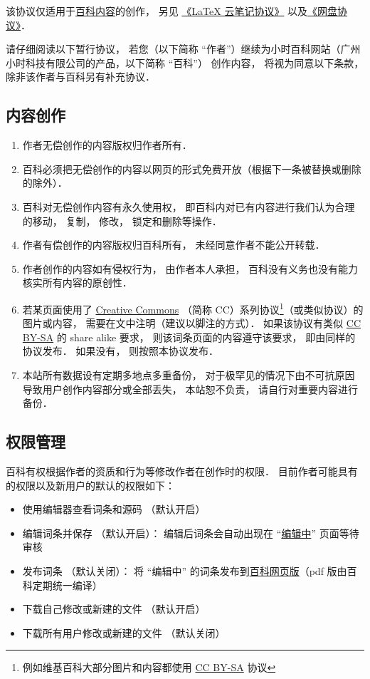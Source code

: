 
该协议仅适用于\href{https://wuli.wiki/online/}{百科内容}的创作， 另见 \href{https://wuli.wiki/online/NtLcns.html}{《LaTeX 云笔记协议》} 以及\href{http://www.example.com}{《网盘协议》}．

请仔细阅读以下暂行协议， 若您（以下简称 “作者”）继续为小时百科网站（广州小时科技有限公司的产品，以下简称 “百科”） 创作内容， 将视为同意以下条款， 除非该作者与百科另有补充协议．

\subsection{内容创作}
\begin{enumerate}
\item 作者无偿创作的内容版权归作者所有．
\item 百科必须把无偿创作的内容以网页的形式免费开放（根据下一条被替换或删除的除外）．
\item 百科对无偿创作内容有永久使用权， 即百科内对已有内容进行我们认为合理的移动， 复制， 修改， 锁定和删除等操作．
\item 作者有偿创作的内容版权归百科所有， 未经同意作者不能公开转载．
\item 作者创作的内容如有侵权行为， 由作者本人承担， 百科没有义务也没有能力核实所有内容的原创性．
\item 若某页面使用了 \href{https://creativecommons.org/licenses/}{Creative Commons} （简称 CC）系列协议\footnote{例如维基百科大部分图片和内容都使用 \href{https://creativecommons.org/licenses/by-sa/3.0/}{CC BY-SA} 协议}（或类似协议）的图片或内容， 需要在文中注明（建议以脚注的方式）． 如果该协议有类似 \href{https://creativecommons.org/licenses/by-sa/3.0/}{CC BY-SA} 的 share alike 要求， 则该词条页面的内容遵守该要求， 即由同样的协议发布． 如果没有， 则按照本协议发布．
\item 本站所有数据设有定期多地点多重备份， 对于极罕见的情况下由不可抗原因导致用户创作内容部分或全部丢失， 本站恕不负责， 请自行对重要内容进行备份．
\end{enumerate}

\subsection{权限管理}
百科有权根据作者的资质和行为等修改作者在创作时的权限． 目前作者可能具有的权限以及新用户的默认的权限如下：
\begin{itemize}
\item 使用编辑器查看词条和源码 （默认开启）
\item 编辑词条并保存 （默认开启）： 编辑后词条会自动出现在 “\href{https://wuli.wiki/changed}{编辑中}” 页面等待审核
\item 发布词条 （默认关闭）： 将 “编辑中” 的词条发布到\href{https://wuli.wiki/online}{百科网页版}（pdf 版由百科定期统一编译）
\item 下载自己修改或新建的文件 （默认开启）
\item 下载所有用户修改或新建的文件 （默认关闭）
\end{itemize}
